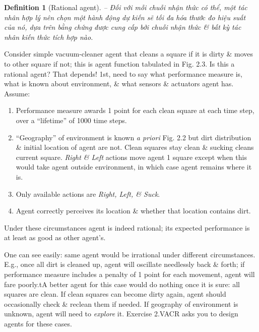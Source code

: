 \documentclass{article}
\newtheorem{definition}{Definition}
\begin{document}
\begin{itemize}
\begin{itemize}
\begin{itemize}
\begin{itemize}
\begin{definition}[Rational agent]
					-- Đối với mỗi chuỗi nhận thức có thể, một {\rm tác nhân hợp lý} nên chọn một hành động dự kiến sẽ tối đa hóa thước đo hiệu suất của nó, dựa trên bằng chứng được cung cấp bởi chuỗi nhận thức \& bất kỳ tác nhân kiến thức tích hợp nào.
				\end{definition}
				Consider simple vacuum-cleaner agent that cleans a square if it is dirty \& moves to other square if not; this is agent function tabulated in {\sf Fig. 2.3}. Is this a rational agent? That depends! 1st, need to say what performance measure is, what is known about environment, \& what sensors \& actuators agent has. Assume:
				\begin{enumerate}
					\item Performance measure awards 1 point for each clean square at each time step, over a ``lifetime'' of 1000 time steps.
					\item ``Geography'' of environment is known {\it a priori} {\sf Fig. 2.2} but dirt distribution \& initial location of agent are not. Clean squares stay clean \& sucking cleans current square. {\it Right \& Left} actions move agent 1 square except when this would take agent outside environment, in which case agent remains where it is.
					\item Only available actions are {\it Right, Left, \& Suck}.
					\item Agent correctly perceives its location \& whether that location contains dirt.
				\end{enumerate}
				Under these circumstances agent is indeed rational; its expected performance is at least as good as other agent's.
				
				One can see easily: same agent would be irrational under different circumstances. E.g., once all dirt is cleaned up, agent will oscillate needlessly back \& forth; if performance measure includes a penalty of 1 point for each movement, agent will fare poorly.tA better agent for this case would do nothing once it is sure: all squares are clean. If clean squares can become dirty again, agent should occasionally check \& reclean them if needed. If geography of environment is unknown, agent will need to {\it explore} it. Exercise 2.VACR asks you to design agents for these cases.
				

\end{itemize}
\end{itemize}
\end{itemize}
\end{itemize}
\end{document}
